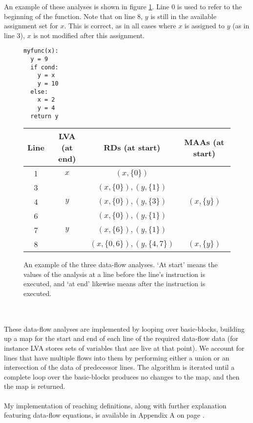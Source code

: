 An example of these analyses is shown in figure \ref{fig:dataflow}. Line 0 is used to refer to the beginning of the function. Note that on line 8, $y$ is still in the available assignment set for $x$. This is correct, as in all cases where $x$ is assigned to $y$ (as in line 3), $x$ is not modified after this assignment.
\begin{figure}[h]
\begin{minipage}{0.25\linewidth}
\begin{verbatim}
myfunc(x):
  y = 9
  if cond:
    y = x
    y = 10
  else:
    x = 2
    y = 4
  return y
\end{verbatim}
\end{minipage}
\begin{minipage}{0.75\linewidth}
\begin{center}
    \begin{tabular}{|c|c|c|c|}
        \hline
        Line & LVA (at end) & RDs (at start) & MAAs (at start) \\
        \hline
        1 & $x$ & $(x, \{0\})$ & \\
        \hline
        3 & & $(x, \{0\}), (y, \{1\})$ & \\
        4 & $y$ & $(x, \{0\}), (y, \{3\})$ & $(x, \{y\})$ \\
        \hline
        6 & & $(x, \{0\}), (y, \{1\})$ & \\
        7 & $y$ & $(x, \{6\}), (y, \{1\})$ & \\
        \hline
        8 & & $(x, \{0, 6\}), (y, \{4, 7\})$ & $(x, \{y\})$ \\
        \hline
    \end{tabular}
\end{center}
\end{minipage}
\caption{An example of the three data-flow analyses. `At start' means the values of the analysis at a line before the line's instruction is executed, and `at end' likewise means after the instruction is executed.}
\label{fig:dataflow}
\end{figure}
\\\\
These data-flow analyses are implemented by looping over basic-blocks, building up a map for the start and end of each line of the required data-flow data (for instance LVA stores sets of variables that are live at that point). We account for lines that have multiple flows into them by performing either a union or an intersection of the data of predecessor lines. The algorithm is iterated until a complete loop over the basic-blocks produces no changes to the map, and then the map is returned.
\\\\
My implementation of reaching definitions, along with further explanation featuring data-flow equations, is available in Appendix A on page \pageref{sample:reach}.

